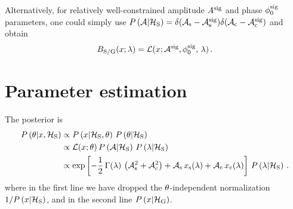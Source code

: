 \documentclass[aps,prd,onecolumn,nofootinbib,superscriptaddress,altaffilletter,floatfix]{revtex4-1}
\begin{document}
Alternatively, for relatively well-constrained amplitude $A^{{\mathrm{sig}}}$ and phase $\phi_0^{\mathrm{sig}}$ parameters, one could simply use $P\left(\mathcal{A}|\mathcal{H}_{\mathrm{S}}\right) = \delta(\mathcal{A}_{\mathrm{s}}-\mathcal{A}_{\mathrm{s}}^{\mathrm{sig}})\delta(\mathcal{A}_{\mathrm{c}}-\mathcal{A}_{\mathrm{c}}^{\mathrm{sig}})$ and obtain
\begin{equation}
  \label{eq:24}
  B_{\mathrm{S/G}}(x;\lambda) = \mathcal{L}(x;\mathcal{A}^{\mathrm{sig}},\phi_0^{\mathrm{sig}},\,\lambda)\,.
\end{equation}

\section{Parameter estimation}
\label{sec:parameter-estimation}

The posterior is
\begin{align}
  \label{eq:30}
  P\left(\theta|x,\mathcal{H}_{\mathrm{S}}\right) &\propto P\left(x|\mathcal{H}_{\mathrm{S}},\theta\right)\,P\left(\theta|\mathcal{H}_{\mathrm{S}}\right)\\
    &\propto \mathcal{L}(x;\theta)\,P\left(\mathcal{A}|\mathcal{H}_{\mathrm{S}}\right)\,P\left(\lambda|\mathcal{H}_{\mathrm{S}}\right)\\
    &\propto \exp\left[-\frac{1}{2}\,\Gamma(\lambda)\,\left(\mathcal{A}_{\mathrm{s}}^2+\mathcal{A}_{\mathrm{c}}^2\right) + \mathcal{A}_{\mathrm{s}}\,x_{\mathrm{s}}(\lambda) + \mathcal{A}_{\mathrm{c}}\,x_{\mathrm{c}}(\lambda)\right]\,P\left(\lambda|\mathcal{H}_{\mathrm{S}}\right)\,.
\end{align}
where in the first line we have dropped the $\theta$-independent normalization $1/P\left(x|\mathcal{H}_{\mathrm{S}}\right)$, and in the second line $P\left(x|\mathcal{H}_{\mathrm{G}}\right)$.




\end{document}

